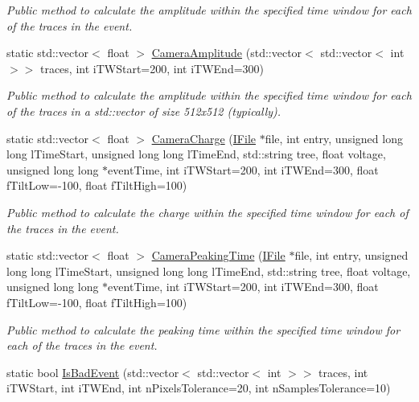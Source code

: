 \begin{DoxyCompactItemize}
\begin{DoxyCompactList}\small\item\em Public method to calculate the amplitude within the specified time window for each of the traces in the event. \end{DoxyCompactList}\item 
static std\+::vector$<$ float $>$ \hyperlink{classIHealthTools_a37c86d665727324db9248a0027a8b871}{Camera\+Amplitude} (std\+::vector$<$ std\+::vector$<$ int $>$$>$ traces, int i\+T\+W\+Start=200, int i\+T\+W\+End=300)
\begin{DoxyCompactList}\small\item\em Public method to calculate the amplitude within the specified time window for each of the traces in a std\+::vector of size 512x512 (typically). \end{DoxyCompactList}\item 
static std\+::vector$<$ float $>$ \hyperlink{classIHealthTools_a41b5b3c853af74854ebb778dfe6aaa76}{Camera\+Charge} (\hyperlink{classIFile}{I\+File} $\ast$file, int entry, unsigned long long l\+Time\+Start, unsigned long long l\+Time\+End, std\+::string tree, float voltage, unsigned long long $\ast$event\+Time, int i\+T\+W\+Start=200, int i\+T\+W\+End=300, float f\+Tilt\+Low=-\/100, float f\+Tilt\+High=100)
\begin{DoxyCompactList}\small\item\em Public method to calculate the charge within the specified time window for each of the traces in the event. \end{DoxyCompactList}\item 
static std\+::vector$<$ float $>$ \hyperlink{classIHealthTools_ac312d1227c3c1bf187dd4a4ea69fff7f}{Camera\+Peaking\+Time} (\hyperlink{classIFile}{I\+File} $\ast$file, int entry, unsigned long long l\+Time\+Start, unsigned long long l\+Time\+End, std\+::string tree, float voltage, unsigned long long $\ast$event\+Time, int i\+T\+W\+Start=200, int i\+T\+W\+End=300, float f\+Tilt\+Low=-\/100, float f\+Tilt\+High=100)
\begin{DoxyCompactList}\small\item\em Public method to calculate the peaking time within the specified time window for each of the traces in the event. \end{DoxyCompactList}\item 
static bool \hyperlink{classIHealthTools_ab44aea2194293cba7ed3975cf1b788cf}{Is\+Bad\+Event} (std\+::vector$<$ std\+::vector$<$ int $>$$>$ traces, int i\+T\+W\+Start, int i\+T\+W\+End, int n\+Pixels\+Tolerance=20, int n\+Samples\+Tolerance=10)

\end{DoxyCompactItemize}
